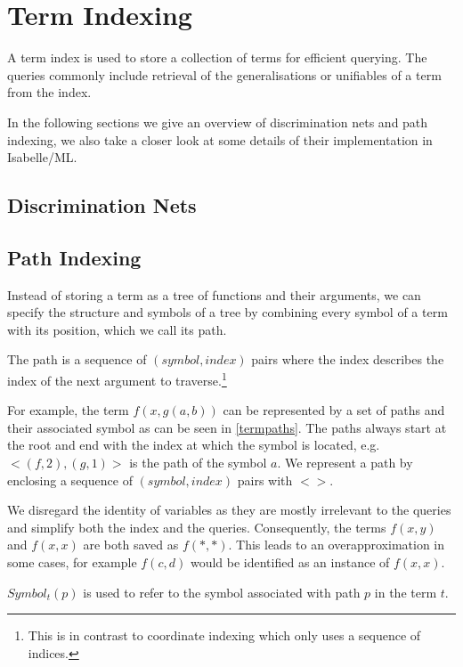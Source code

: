 \chapter{Term Indexing}
A term index is used to store a collection of terms for efficient querying. The queries commonly include retrieval of the generalisations or unifiables of a term from the index. 

In the following sections we give an overview of discrimination nets and path indexing, we also take a closer look at some details of their implementation in Isabelle/ML.

\section{Discrimination Nets}

\section{Path Indexing}
Instead of storing a term as a tree of functions and their arguments, we can specify the structure and symbols of a tree by combining every symbol of a term with its position, which we call its path.
\begin{defn}
  The path is a sequence of $(symbol, index)$ pairs where the index describes the index of the next argument to traverse.\footnote{This is in contrast to coordinate indexing which only uses a sequence of indices.}
\end{defn}
For example, the term $f(x,g(a,b))$ can be represented by a set of paths and their associated symbol as can be seen in \cref{termpaths}.
The paths always start at the root and end with the index at which the symbol is located, e.g. $<(f,2), (g,1)>$ is the path of the symbol $a$. We represent a path by enclosing a sequence of $(symbol, index)$ pairs with $<>$. 

We disregard the identity of variables as they are mostly irrelevant to the queries and simplify both the index and the queries. Consequently, the terms $f(x,y)$ and $f(x,x)$ are both saved as $f(*,*)$. This leads to an overapproximation in some cases, for example $f(c,d)$ would be identified as an instance of $f(x,x)$.

\begin{defn}
  $Symbol_{t}(p)$ is used to refer to the symbol associated with path $p$ in the term $t$.
\end{defn}

